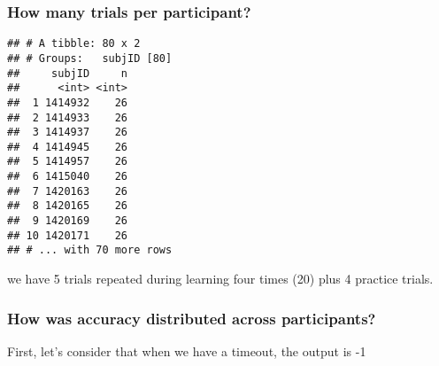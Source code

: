 \documentclass[
]{article}
\newenvironment{Shaded}{\begin{snugshade}}{\end{snugshade}}
\newcommand{\DecValTok}[1]{\textcolor[rgb]{0.00,0.00,0.81}{#1}}
\newcommand{\KeywordTok}[1]{\textcolor[rgb]{0.13,0.29,0.53}{\textbf{#1}}}
\newcommand{\NormalTok}[1]{#1}
\newcommand{\OperatorTok}[1]{\textcolor[rgb]{0.81,0.36,0.00}{\textbf{#1}}}
\newcommand{\StringTok}[1]{\textcolor[rgb]{0.31,0.60,0.02}{#1}}
\begin{document}
\begin{Shaded}
\end{Shaded}

\hypertarget{how-many-trials-per-participant-3}{%
\subsubsection{How many trials per
participant?}\label{how-many-trials-per-participant-3}}

\begin{Shaded}
\end{Shaded}

\begin{verbatim}
## # A tibble: 80 x 2
## # Groups:   subjID [80]
##     subjID     n
##      <int> <int>
##  1 1414932    26
##  2 1414933    26
##  3 1414937    26
##  4 1414945    26
##  5 1414957    26
##  6 1415040    26
##  7 1420163    26
##  8 1420165    26
##  9 1420169    26
## 10 1420171    26
## # ... with 70 more rows
\end{verbatim}

we have 5 trials repeated during learning four times (20) plus 4
practice trials.

\hypertarget{how-was-accuracy-distributed-across-participants}{%
\subsubsection{How was accuracy distributed across
participants?}\label{how-was-accuracy-distributed-across-participants}}

First, let's consider that when we have a timeout, the output is -1

\begin{Shaded}
\end{Shaded}
\end{document}
